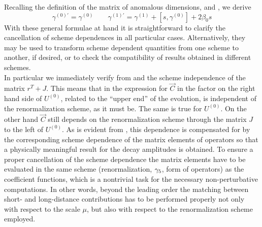 Recalling the definition of the matrix of anomalous dimensions,
 and , we derive
\begin{equation}\label{gpgs}\gamma^{(0)\prime}=\gamma^{(0)} \qquad
 \gamma^{(1)\prime}=\gamma^{(1)}+[s,\gamma^{(0)}]+2\beta_0 s \end{equation}
With these general formulae at hand it is straightforward to
clarify the cancellation of scheme dependences in all particular
cases. Alternatively, they may be used to transform scheme
dependent quantities from one scheme to another, if desired, or to
check the compatibility of results obtained in different schemes.
\\
In particular we immediately verify from  and  the
scheme independence of the matrix $r^T+J$. This means that in the
expression for $\vec C$ in  the factor on the right hand
side of $U^{(0)}$, related to the ``upper end'' of the evolution,
is independent of the renormalization scheme, as it must be. The
same is true for $U^{(0)}$. On the other hand $\vec C$ still
depends on the renormalization scheme through the matrix $J$ to the
left of $U^{(0)}$. As is evident from ,
this dependence is compensated for by the
corresponding scheme dependence of the matrix elements of operators
so that a physically meaningful result for the decay amplitudes
is obtained.
To ensure a proper cancellation of the scheme dependence the matrix
elements have to be evaluated in the same scheme
(renormalization, $\gamma_5$, form of operators) as the coefficient
functions, which is a nontrivial task for the necessary
non-perturbative computations. In other words, beyond the leading
order the matching between short- and long-distance contributions has
to be performed properly not only with respect to the scale $\mu$,
but also with respect to the renormalization scheme employed.

